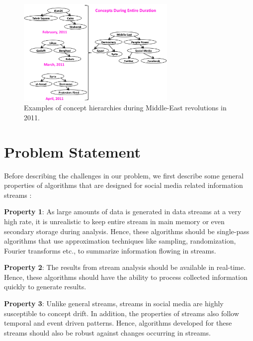 \documentclass{sig-alternate}
\begin{document}
\begin{figure}
\begin{center}
\includegraphics[width=3.0in]{images/concept_examples}
\caption{Examples of concept hierarchies during Middle-East revolutions in 2011.}
\label{fig:concept-examples}
\end{center}
\end{figure}

\section{Problem Statement}
\medskip Before describing the challenges in our problem, we first describe some general properties of algorithms that are designed for social media related information streams \cite{joao:2010:kdd}: 

\smallskip\noindent\textbf{Property 1}: As large amounts of data is generated in data streams at a very high rate, it is unrealistic to keep entire stream in main memory or even secondary storage during analysis. Hence, these algorithms should be single-pass algorithms that use approximation techniques like sampling, randomization, Fourier transforms etc., to summarize information flowing in streams.

\smallskip\noindent\textbf{Property 2}: The results from stream analysis should be available in real-time. Hence, these algorithms should have the ability to process collected information quickly to generate results.  

\smallskip\noindent \textbf{Property 3}: Unlike general streams, streams in social media are highly susceptible to concept drift. In addition, the properties of streams also follow temporal and event driven patterns. Hence, algorithms developed for these streams should also be robust against changes occurring in streams.
\end{document}

